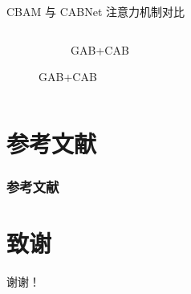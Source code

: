 \documentclass[9pt, aspectratio=1610]{beamer}
\begin{document}
\begin{frame}{CBAM 与 CABNet 注意力机制对比}
\begin{columns}
\begin{column}{0.6\textwidth}
\begin{figure}[H]
\begin{subfigure}[b]{0.2\textwidth}
                    \caption{GAB+CAB}
                \end{subfigure}
            \end{figure}
        \end{column}
    \end{columns}

        
    \end{frame}

\section*{参考文献}
\begin{frame}[allowframebreaks]
    \linespread{1.1}
    \frametitle{参考文献}
    \small
    \nocite{*}
    
    
\end{frame}


\section*{致谢}  
\begin{frame}
\centering
\let\thefootnote\relax{}
\let\thefootnote\relax{}
\let\thefootnote\relax\footnotetext{}

\textcolor{myNewColorA}{\Huge{\centerline{谢谢！}}}
\end{frame}
\end{document}
